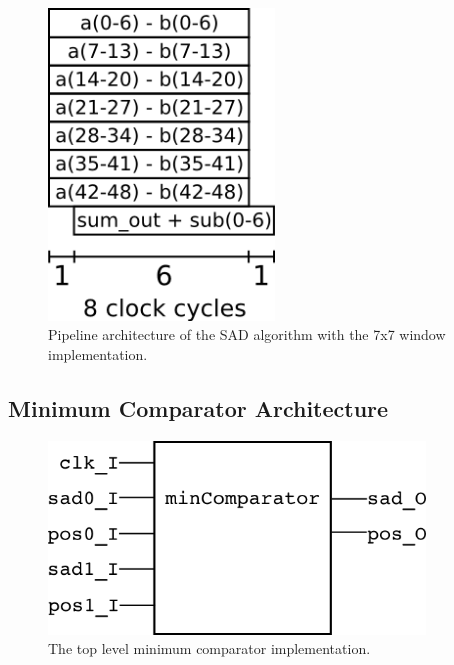 \begin{figure}[h]
	\begin{center}
		\includegraphics[width=60mm]{figures/sadPipeline7x7.png}
		\captionfonts
		\caption{Pipeline architecture of the SAD algorithm with the 7x7 window implementation.}
		\label{fig:sadPipe7x7}
	\end{center}
\end{figure}


\subsection{Minimum Comparator Architecture}


\begin{figure}[h]
	\begin{center}
		\includegraphics[width=100mm]{figures/minComparator_rtl.png}
		\captionfonts
		\caption{The top level minimum comparator implementation.}
		\label{fig:minComp_rtl}
	\end{center}
\end{figure}


